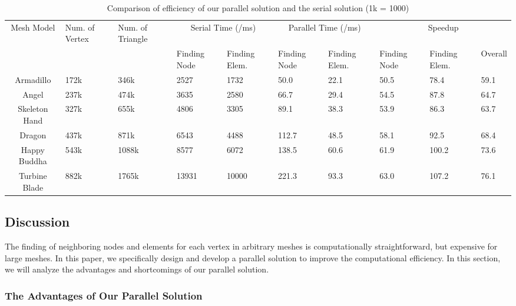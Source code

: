 \documentclass[twocolumn]{svjour3}          \smartqed  \usepackage{graphicx}
\begin{document}
\begin{table*}[htbp]
	\caption{Comparison of efficiency of our parallel solution and the serial solution (1k = 1000)}
	\centering
	\begin{tabular}
		{|c|p{31pt}|p{32pt}|p{21pt}|p{21pt}|p{21pt}|p{21pt}|p{21pt}|p{21pt}|p{21pt}|}
\hline
		{Mesh Model}& 
		{Num. of Vertex}& 
		{Num. of Triangle}& 
		\multicolumn{2}{|c|}{Serial Time (/ms)} & 
		\multicolumn{2}{|c|}{Parallel Time (/ms)} & 
		\multicolumn{3}{|c|}{Speedup}  \\
		\cline{4-10} 
		& 
		& 
		& 
		Finding Node& 
		Finding Elem.& 
		Finding Node& 
		Finding Elem.& 
		Finding Node& 
		Finding Elem.& 
		Overall \\
		\hline
		Armadillo& 
		172k& 
		346k& 
		2527& 
		1732& 
		50.0& 
		22.1& 
		50.5& 
		78.4& 
		59.1 \\
		\hline
		Angel& 
		237k& 
		474k& 
		3635& 
		2580& 
		66.7& 
		29.4& 
		54.5& 
		87.8& 
		64.7 \\
		\hline
		Skeleton Hand& 
		327k& 
		655k& 
		4806& 
		3305& 
		89.1& 
		38.3& 
		53.9& 
		86.3& 
		63.7 \\
		\hline
		Dragon& 
		437k& 
		871k& 
		6543& 
		4488& 
		112.7& 
		48.5& 
		58.1& 
		92.5& 
		68.4 \\
		\hline
		Happy Buddha& 
		543k& 
		1088k& 
		8577& 
		6072& 
		138.5& 
		60.6& 
		61.9& 
		100.2& 
		73.6 \\
		\hline
		Turbine Blade& 
		882k& 
		1765k& 
		13931& 
		10000& 
		221.3& 
		93.3& 
		63.0& 
		107.2& 
		76.1 \\
		\hline
	\end{tabular}
	\label{tab1}
\end{table*}

\subsection{Discussion}

The finding of neighboring nodes and elements for each vertex in arbitrary 
meshes is computationally straightforward, but expensive for large meshes. 
In this paper, we specifically design and develop a parallel solution to 
improve the computational efficiency. In this section, we will analyze the 
advantages and shortcomings of our parallel solution.

\subsubsection{The Advantages of Our Parallel Solution}
\end{document}
